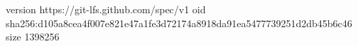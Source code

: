 version https://git-lfs.github.com/spec/v1
oid sha256:d105a8cea4f007e821e47a1fe3d72174a8918da91ea5477739251d2db45b6c46
size 1398256
